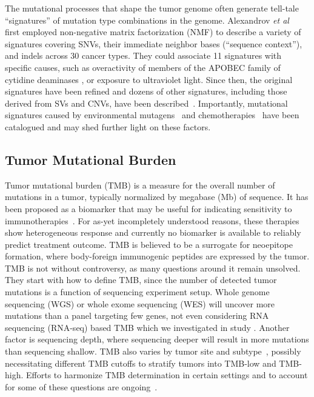 \documentclass[11pt]{book}
\begin{document}
The mutational processes that shape the tumor genome often generate tell-tale ``signatures'' of mutation type combinations in the genome. Alexandrov \textit{et al}~\cite{Alexandrov:2013} first employed non-negative matrix factorization (NMF) to describe a variety of signatures covering SNVs, their immediate neighbor bases (``sequence context''), and indels across 30 cancer types. They could associate 11 signatures with specific causes, such as overactivity of members of the APOBEC family of cytidine deaminases \cite{Burns:2013}, or exposure to ultraviolet light. Since then, the original signatures have been refined and dozens of other signatures, including those derived from SVs and CNVs, have been described~\cite{Alexandrov:2016, Alexandrov:2020, Degasperi:2020}. Importantly, mutational signatures caused by environmental mutagens~\cite{Kucab:2020} and chemotherapies~\cite{Pich:2019} have been catalogued and may shed further light on these factors.


\subsection{Tumor Mutational Burden}

Tumor mutational burden (TMB) is a measure for the overall number of mutations in a tumor, typically normalized by megabase (Mb) of sequence. It has been proposed as a biomarker that may be useful for indicating sensitivity to immunotherapies~\cite{Samstein:2019}. For as-yet incompletely understood reasons, these therapies show heterogeneous response and currently no biomarker is available to reliably predict treatment outcome. TMB is believed to be a surrogate for neoepitope formation, where body-foreign immunogenic peptides are expressed by the tumor. TMB is not without controversy, as many questions around it remain unsolved. They start with how to define TMB, since the number of detected tumor mutations is a function of sequencing experiment setup. Whole genome sequencing (WGS) or whole exome sequencing (WES) will uncover more mutations than a panel targeting few genes, not even considering RNA sequencing (RNA-seq) based TMB which we investigated in study \IV. Another factor is sequencing depth, where sequencing deeper will result in more mutations than sequencing shallow. TMB also varies by tumor site and subtype~\cite{Chalmers:2017}, possibly necessitating different TMB cutoffs to stratify tumors into TMB-low and TMB-high. Efforts to harmonize TMB determination in certain settings and to account for some of these questions are ongoing~\cite{Merino:2020}.
\end{document}
